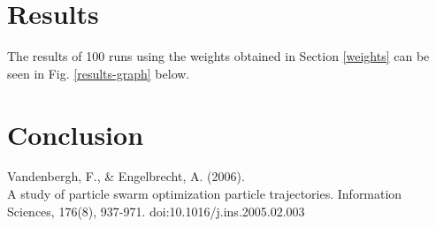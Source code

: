 \documentclass[12pt]{article}
\numberwithin{table}{section}
\begin{document}
\section{Results}
The results of 100 runs using the weights obtained in Section \ref{weights} can be seen in Fig. \ref{results-graph} below.

\section{Conclusion}



\begin{thebibliography}{12}
Vandenbergh, F., \& Engelbrecht, A. (2006).
\\A study of particle swarm optimization particle trajectories. Information Sciences, 176(8), 937-971. doi:10.1016/j.ins.2005.02.003
\end{thebibliography}
\end{document}
